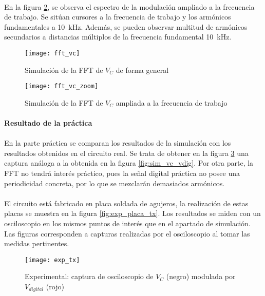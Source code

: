 \paragraph{}
En la figura \ref{fig:sim_fft_zoom}, se observa el espectro de la modulación ampliado a la frecuencia de trabajo. Se sitúan cursores a la frecuencia de trabajo y los armónicos fundamentales a \SI{10}{\kilo\hertz}. Además, se pueden observar multitud de armónicos secundarios a distancias múltiplos de la frecuencia fundamental \SI{10}{\kilo\hertz}.
\begin{figure}[h!]
    \centering
    \texttt{[image: fft\_vc]}
    \caption{Simulaci\'on de la FFT de $V_C$ de forma general}
    \label{fig:sim_fft}
\end{figure}
\begin{figure}[h!]
    \centering
    \texttt{[image: fft\_vc\_zoom]}
    \caption{Simulaci\'on de la FFT de $V_C$ ampliada a la frecuencia de trabajo}
    \label{fig:sim_fft_zoom}
\end{figure}

\paragraph{Resultado de la pr\'actica} %
\paragraph{}
En la parte práctica se comparan los resultados de la simulación con los resultados obtenidos en el circuito real. 
Se trata de obtener en la figura \ref{fig:exp_vc_vdig} una captura an\'aloga a la obtenida en la figura \ref{fig:sim_vc_vdig}.
Por otra parte, la FFT no tendr\'a interés práctico, pues la señal digital práctica no posee una periodicidad concreta, por lo que se mezclarán demasiados armónicos.
\paragraph{}
El circuito está fabricado en placa soldada de agujeros, la realizaci\'on de estas placas se muestra en la figura \ref{fig:exp_placa_tx}. Los resultados se miden con un osciloscopio en los mismos puntos de interés que en el apartado de simulación. Las figuras corresponden a capturas realizadas por el osciloscopio al tomar las medidas pertinentes.

\begin{figure}[h!]
    \centering
    \texttt{[image: exp\_tx]}
    \caption{Experimental: captura de osciloscopio de $V_C$ (negro) modulada por $V_{digital}$ (rojo)}
    \label{fig:exp_vc_vdig}
\end{figure}

